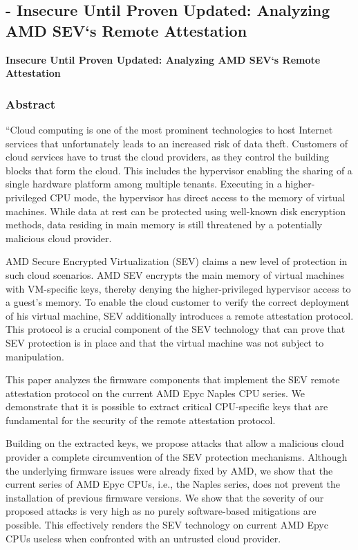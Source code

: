 
\subsection{\cite{buhren_insecure_2019} - Insecure Until Proven Updated: Analyzing AMD SEV‘s Remote Attestation}

\textbf{Insecure Until Proven Updated: Analyzing AMD SEV‘s Remote Attestation} 

\subsubsection*{Abstract  \cite{buhren_insecure_2019}}
“Cloud computing is one of the most prominent technologies to host Internet services that unfortunately leads to an increased risk of data theft. Customers of cloud services have to trust the cloud providers, as they control the building blocks that form the cloud. This includes the hypervisor enabling the sharing of a single hardware platform among multiple tenants. Executing in a higher-privileged CPU mode, the hypervisor has direct access to the memory of virtual machines. While data at rest can be protected using well-known disk encryption methods, data residing in main memory is still threatened by a potentially malicious cloud provider.

AMD Secure Encrypted Virtualization (SEV) claims a new level of protection in such cloud scenarios. AMD SEV encrypts the main memory of virtual machines with VM-specific keys, thereby denying the higher-privileged hypervisor access to a guest’s memory. To enable the cloud customer to verify the correct deployment of his virtual machine, SEV additionally introduces a remote attestation protocol. This protocol is a crucial component of the SEV technology that can prove that SEV protection is in place and that the virtual machine was not subject to manipulation.

This paper analyzes the firmware components that implement the SEV remote attestation protocol on the current AMD Epyc Naples CPU series. We demonstrate that it is possible to extract critical CPU-specific keys that are fundamental for the security of the remote attestation protocol.

Building on the extracted keys, we propose attacks that allow a malicious cloud provider a complete circumvention of the SEV protection mechanisms. Although the underlying firmware issues were already fixed by AMD, we show that the current series of AMD Epyc CPUs, i.e., the Naples series, does not prevent the installation of previous firmware versions. We show that the severity of our proposed attacks is very high as no purely software-based mitigations are possible. This effectively renders the SEV technology on current AMD Epyc CPUs useless when confronted with an untrusted cloud provider.


